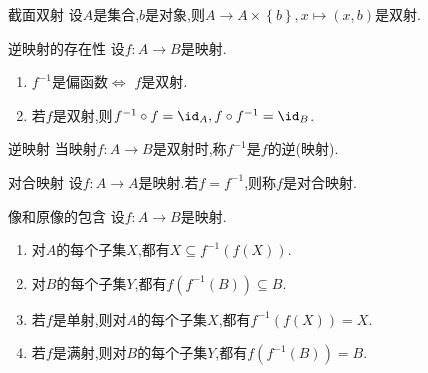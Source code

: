 \begin{example}{截面双射}{}
	设$A$是集合,$b$是对象,则$A\to A\times\left\{b\right\},x\mapsto\left(x,b\right)$是双射.
\end{example}

\begin{proposition}{逆映射的存在性}{}
	设$f:A\to B$是映射.
	\begin{enumerate}
		\item $f^{-1}$是偏函数$\iff$ $f$是双射.
		\item 若$f$是双射,则$f^{-1}\circ f=\id_{A},f\circ f^{-1}=\id_{B}$.
	\end{enumerate}
\end{proposition}

\begin{definition}{逆映射}{}
	当映射$f:A\to B$是双射时,称$f^{-1}$是$f$的逆(映射).
\end{definition}

\begin{definition}{对合映射}{}
	设$f:A\to A$是映射.若$f=f^{-1}$,则称$f$是对合映射.
\end{definition}

\begin{proposition}{像和原像的包含}{}
	设$f:A\to B$是映射.
	\begin{enumerate}
		\item 对$A$的每个子集$X$,都有$X\subseteq f^{-1}\left(f\left(X\right)\right)$.
		\item 对$B$的每个子集$Y$,都有$f\left(f^{-1}\left(B\right)\right)\subseteq B$.
		\item 若$f$是单射,则对$A$的每个子集$X$,都有$f^{-1}\left(f\left(X\right)\right)=X$.
		\item 若$f$是满射,则对$B$的每个子集$Y$,都有$f\left(f^{-1}\left(B\right)\right)=B$.
	\end{enumerate}
\end{proposition}




















